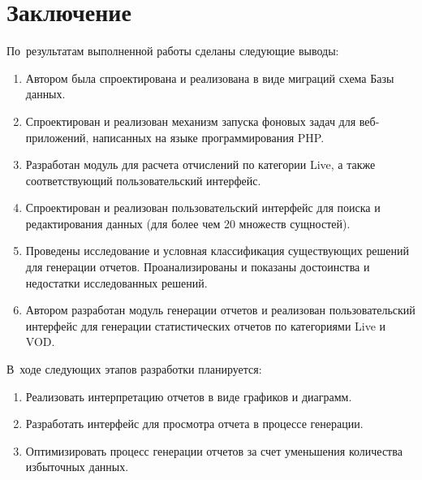 \section*{Заключение}

По~результатам выполненной работы сделаны следующие выводы:

\begin{enumerate}
\item {
Автором была спроектирована и реализована в виде миграций схема
Базы данных.
}
\item {
Спроектирован и реализован механизм запуска фоновых задач для веб-приложений, написанных
на языке программирования PHP.
}
\item {
Разработан модуль для расчета отчислений по категории Live, а также соответствующий
пользовательский интерфейс. 
}
\item {
Спроектирован и реализован пользовательский интерфейс для поиска
и редактирования данных (для более чем 20 множеств сущностей).
}
\item {
Проведены исследование и условная классификация существующих 
решений для генерации отчетов. 
Проанализированы и показаны достоинства и недостатки исследованных решений.
}
\item {
Автором разработан модуль генерации отчетов и реализован
пользовательский интерфейс для генерации статистических отчетов
по категориями Live и VOD.
}
\end{enumerate}

В~ходе следующих этапов разработки планируется:
\begin{enumerate}
\item {
Реализовать интерпретацию отчетов в виде графиков и диаграмм.
}
\item {
Разработать интерфейс для просмотра отчета в процессе генерации.
}
\item {
Оптимизировать процесс генерации отчетов за счет уменьшения количества избыточных данных.
}
\end{enumerate}
